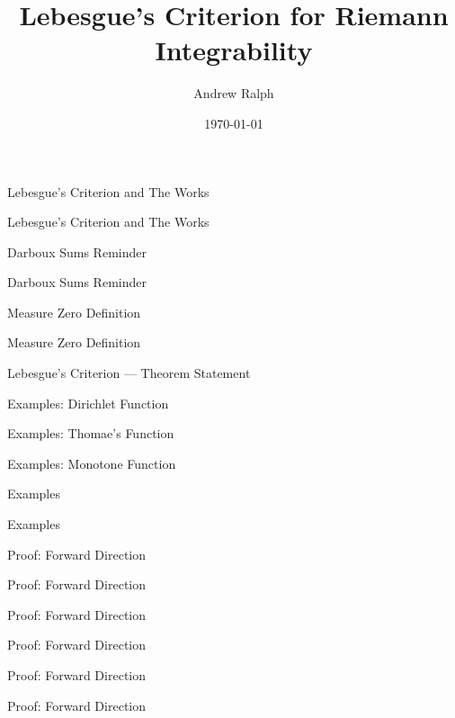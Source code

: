 \documentclass[9pt]{beamer}
\title{Lebesgue's Criterion for Riemann Integrability}
\author{Andrew Ralph}
\date{\today}
\begin{document}
\begin{frame}{Lebesgue's Criterion and The Works}
\end{frame}
\begin{frame}{Lebesgue's Criterion and The Works}
\end{frame}

\begin{frame}{Darboux Sums Reminder}
\end{frame}
\begin{frame}{Darboux Sums Reminder}
\end{frame}

\begin{frame}{Measure Zero Definition}
\end{frame}
\begin{frame}{Measure Zero Definition}
\end{frame}

\begin{frame}{Lebesgue's Criterion — Theorem Statement}
\end{frame}

\begin{frame}{Examples: Dirichlet Function}
\end{frame}
\begin{frame}{Examples: Thomae's Function}
\end{frame}
\begin{frame}{Examples: Monotone Function}
\end{frame}
\begin{frame}{Examples} 
\end{frame}
\begin{frame}{Examples}
\end{frame}

\begin{frame}{Proof: Forward Direction}
\end{frame}
\begin{frame}{Proof: Forward Direction}
\end{frame}
\begin{frame}{Proof: Forward Direction}
\end{frame}
\begin{frame}{Proof: Forward Direction}
\end{frame}
\begin{frame}{Proof: Forward Direction}
\end{frame}
\begin{frame}{Proof: Forward Direction}
\end{frame}
\end{document}
